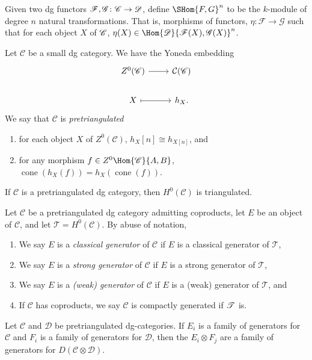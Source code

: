 \documentclass[10pt]{amsart}
\begin{document}
\begin{defn}
  Given two dg functors $\mathscr{F},\mathscr{G} \colon \mathscr{C} \rightarrow \mathscr{D}$, define $\SHom{F,G}^n$ to be the $k$-module of degree $n$ natural transformations.
  That is, morphisms of functors, $\eta \colon \mathscr{F} \rightarrow \mathscr{G}$ such that for each object $X$ of $\mathscr{C}$, $\eta(X) \in \Hom{\D}{\mathscr{F}(X),\mathscr{G}(X)}^n$.
\end{defn}

\begin{rmk}
\end{rmk}

\begin{defn}
  Let $\mathscr{C}$ be a small dg category.
  We have the Yoneda embedding 
  $$\begin{tikzcd}
    Z^0(\mathscr{C}) \arrow{r} & \mathcal{C}(\mathscr{C})\\
    X \arrow[mapsto]{r} & h_X.
  \end{tikzcd}$$
  We say that $\mathscr{C}$ is {\it pretriangulated}
  \begin{enumerate}
  \item
    for each object $X$ of $Z^0(\mathscr{C})$, $h_X[n] \cong h_{X[n]}$, and
  \item
    for any morphism $f \in Z^0\Hom{\mathscr{C}}{A,B}$, $\operatorname{cone}(h_X(f)) = h_X(\operatorname{cone}(f))$.
  \end{enumerate}
\end{defn}

\begin{prop}
  If $\mathscr{C}$ is a pretriangulated dg category, then $H^0(\mathscr{C})$ is triangulated.
\end{prop}

\begin{defn}
  Let $\mathscr{C}$ be a pretriangulated dg category admitting coproducts, let $E$ be an object of $\mathscr{C}$, and let $\mathscr{T} = H^0(\mathscr{C})$.
  By abuse of notation, 
  \begin{enumerate}
  \item
    We say $E$ is a {\it classical generator} of $\mathscr{C}$ if $E$ is a classical generator of $\mathscr{T}$,
  \item
    We say $E$ is a {\it strong generator} of $\mathscr{C}$ if $E$ is a strong generator of $\mathscr{T}$,
  \item
    We say $E$ is a {\it (weak) generator} of $\mathscr{C}$ if $E$ is a (weak) generator of $\mathscr{T}$, and
  \item
    If $\mathscr{C}$ has coproducts, we say $\mathscr{C}$ is compactly generated if $\mathscr{T}$ is.
  \end{enumerate}
\end{defn}

\begin{thm}
  Let $\mathscr{C}$ and $\mathscr{D}$ be pretriangulated dg-categories.
  If $E_i$ is a family of generators for $\mathscr{C}$ and $F_i$ is a family of generators for $\mathscr{D}$, then the $E_i \otimes F_j$ are a family of generators for $D\left(\mathscr{C} \otimes \mathscr{D}\right)$.
\end{thm}
\end{document}

